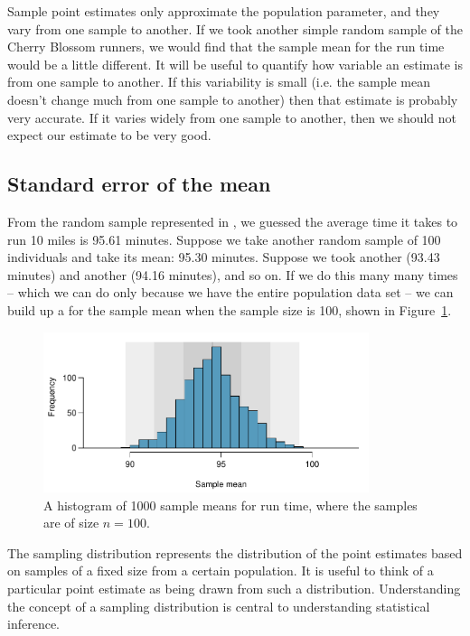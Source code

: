 Sample point estimates only approximate the population parameter, and they vary from one sample to another. If we took another simple random sample of the Cherry Blossom runners, we would find that the sample mean for the run time would be a little different. It will be useful to quantify how variable
an estimate is from one sample to another. If this variability is small (i.e. the sample mean doesn't change much from one sample to another) then that estimate is probably very accurate. If it varies widely from one sample to another, then we should not expect our estimate to be very good.


\subsection{Standard error of the mean}
\label{seOfTheMean}

From the random sample represented in , we guessed the average time it takes to run 10 miles is 95.61 minutes. Suppose we take another random sample of 100 individuals and take its mean: 95.30 minutes. Suppose we took another (93.43 minutes) and another (94.16 minutes), and so on. If we do this many many times -- which we can do only because we have the entire population data set -- we can build up a  for the sample mean when the sample size is 100, shown in Figure~\ref{netTime1000SamplingDistribution}.

\begin{figure}
   \centering
   \includegraphics[width=0.85\textwidth]{04/figures/netTime1000SamplingDistribution/netTime1000SamplingDistribution}
   \caption{A histogram of 1000 sample means for run time, where the samples are of size $n=100$.}
   \label{netTime1000SamplingDistribution}
\end{figure}

\begin{termBox}{
The sampling distribution represents the distribution of the point estimates based on samples of a fixed size from a certain population. It is useful to think of a particular point estimate as being drawn from such a distribution. Understanding the concept of a sampling distribution is central to understanding statistical inference.}
\end{termBox}

